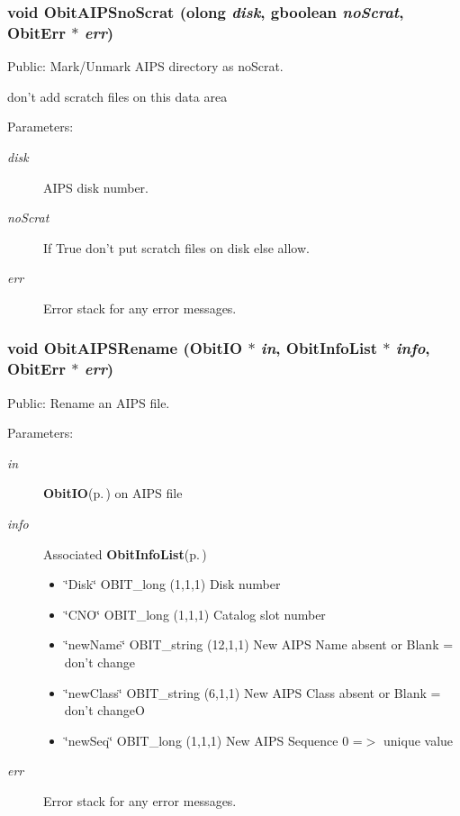 \subsubsection{\setlength{\rightskip}{0pt plus 5cm}void Obit\-AIPSno\-Scrat ({\bf olong} {\em disk}, gboolean {\em no\-Scrat}, {\bf Obit\-Err} $\ast$ {\em err})}\label{ObitAIPS_8c_a21}


Public: Mark/Unmark AIPS directory as no\-Scrat. 

don't add scratch files on this data area \begin{Desc}
\item[Parameters:]
\begin{description}
\item[{\em disk}]AIPS disk number. \item[{\em no\-Scrat}]If True don't put scratch files on disk else allow. \item[{\em err}]Error stack for any error messages. \end{description}
\end{Desc}
\subsubsection{\setlength{\rightskip}{0pt plus 5cm}void Obit\-AIPSRename ({\bf Obit\-IO} $\ast$ {\em in}, {\bf Obit\-Info\-List} $\ast$ {\em info}, {\bf Obit\-Err} $\ast$ {\em err})}\label{ObitAIPS_8c_a18}


Public: Rename an AIPS file. 

\begin{Desc}
\item[Parameters:]
\begin{description}
\item[{\em in}]{\bf Obit\-IO}{\rm (p.\,\pageref{structObitIO})} on AIPS file \item[{\em info}]Associated {\bf Obit\-Info\-List}{\rm (p.\,\pageref{structObitInfoList})} \begin{itemize}
\item \char`\"{}Disk\char`\"{} OBIT\_\-long (1,1,1) Disk number \item \char`\"{}CNO\char`\"{} OBIT\_\-long (1,1,1) Catalog slot number \item \char`\"{}new\-Name\char`\"{} OBIT\_\-string (12,1,1) New AIPS Name absent or Blank = don't change \item \char`\"{}new\-Class\char`\"{} OBIT\_\-string (6,1,1) New AIPS Class absent or Blank = don't change\-O \item \char`\"{}new\-Seq\char`\"{} OBIT\_\-long (1,1,1) New AIPS Sequence 0 =$>$ unique value \end{itemize}
\item[{\em err}]Error stack for any error messages. \end{description}
\end{Desc}
